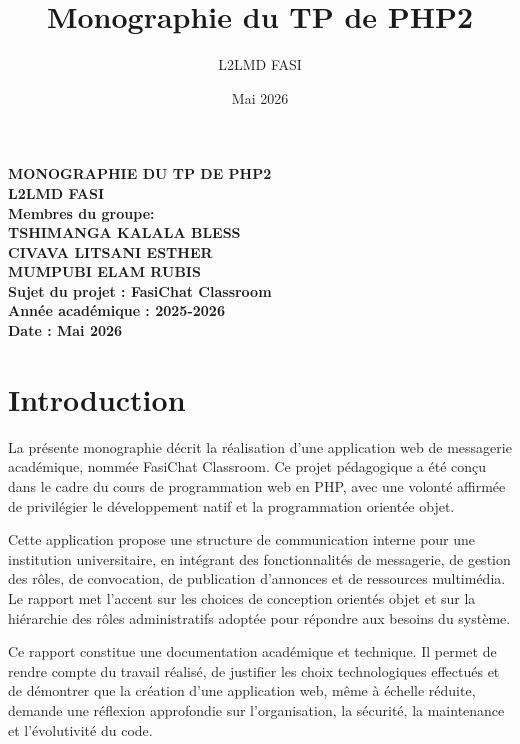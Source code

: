 \documentclass[12pt,a4paper]{article}
\title{Monographie du TP de PHP2}
\author{L2LMD FASI}
\date{Mai 2026}
\begin{document}
\thispagestyle{empty}
\begin{center}
  \textbf{MONOGRAPHIE DU TP DE PHP2} \\
\vspace{0.8cm}
\textbf{L2LMD FASI} \\
\vspace{1.5cm}
\textbf{Membres du groupe:} \\
\vspace{0.7cm}
\textbf{TSHIMANGA KALALA BLESS } \\
\vspace{1cm}
\textbf{CIVAVA LITSANI ESTHER} \\
\vspace{1cm}
\textbf{MUMPUBI ELAM RUBIS} \\
\vspace{1.5cm}
\textbf{Sujet du projet :  FasiChat Classroom} \\
\vspace{1.5cm}
\textbf{Année académique : 2025-2026} \\
\vspace{0.5cm}
\textbf{Date : Mai 2026}
\end{center}
\newpage
\tableofcontents
\newpage
\section{Introduction}
La présente monographie décrit la réalisation d'une application web de messagerie académique, nommée FasiChat Classroom. Ce projet pédagogique a été conçu dans le cadre du cours de programmation web en PHP, avec une volonté affirmée de privilégier le développement natif et la programmation orientée objet.

Cette application propose une structure de communication interne pour une institution universitaire, en intégrant des fonctionnalités de messagerie, de gestion des rôles, de convocation, de publication d'annonces et de ressources multimédia. Le rapport met l'accent sur les choices de conception orientés objet et sur la hiérarchie des rôles administratifs adoptée pour répondre aux besoins du système.

Ce rapport constitue une documentation académique et technique. Il permet de rendre compte du travail réalisé, de justifier les choix technologiques effectués et de démontrer que la création d’une application web, même à échelle réduite, demande une réflexion approfondie sur l’organisation, la sécurité, la maintenance et l’évolutivité du code.
\end{document}
